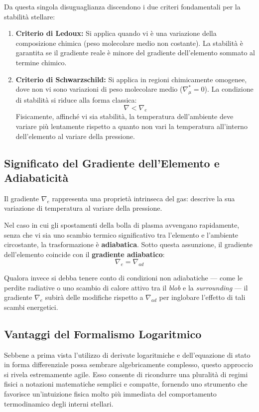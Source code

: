 Da questa singola disuguaglianza discendono i due criteri fondamentali per la stabilità stellare:
\begin{enumerate}
\item \textbf{Criterio di Ledoux:} Si applica quando vi è una variazione della composizione chimica (peso molecolare medio non costante). La stabilità è garantita se il gradiente reale è minore del gradiente dell'elemento sommato al termine chimico.
\item \textbf{Criterio di Schwarzschild:} Si applica in regioni chimicamente omogenee, dove non vi sono variazioni di peso molecolare medio ($\nabla_\mu^* = 0$). La condizione di stabilità si riduce alla forma classica:
\begin{equation}
\nabla < \nabla_e
\end{equation}
Fisicamente, affinché vi sia stabilità, la temperatura dell'ambiente deve variare più lentamente rispetto a quanto non vari la temperatura all'interno dell'elemento al variare della pressione.
\end{enumerate}

\subsection{Significato del Gradiente dell'Elemento e Adiabaticità}

Il gradiente $\nabla_e$ rappresenta una proprietà intrinseca del gas: descrive la sua variazione di temperatura al variare della pressione.

Nel caso in cui gli spostamenti della bolla di plasma avvengano rapidamente, senza che vi sia uno scambio termico significativo tra l'elemento e l'ambiente circostante, la trasformazione è \textbf{adiabatica}. Sotto questa assunzione, il gradiente dell'elemento coincide con il \textbf{gradiente adiabatico}:
\begin{equation}
\nabla_e = \nabla_{ad}
\end{equation}

Qualora invece si debba tenere conto di condizioni non adiabatiche — come le perdite radiative o uno scambio di calore attivo tra il \textit{blob} e la \textit{surrounding} — il gradiente $\nabla_e$ subirà delle modifiche rispetto a $\nabla_{ad}$ per inglobare l'effetto di tali scambi energetici.

\subsection{Vantaggi del Formalismo Logaritmico}
Sebbene a prima vista l'utilizzo di derivate logaritmiche e dell'equazione di stato in forma differenziale possa sembrare algebricamente complesso, questo approccio si rivela estremamente agile. Esso consente di ricondurre una pluralità di regimi fisici a notazioni matematiche semplici e compatte, fornendo uno strumento che favorisce un'intuizione fisica molto più immediata del comportamento termodinamico degli interni stellari.

